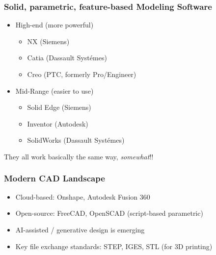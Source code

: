 \begin{frame}[fragile]\frametitle{Solid, parametric, feature-based Modeling Software}

\begin{itemize}
\item High-end (more powerful)
\begin{itemize}

\item NX (Siemens)
\item Catia (Dassault Syst\'{e}mes)
\item Creo (PTC, formerly Pro/Engineer)
\end{itemize}

\item Mid-Range (easier to use)
\begin{itemize}

\item Solid Edge (Siemens)
\item Inventor (Autodesk)
\item SolidWorks (Dassault Syst\'{e}mes)
\end{itemize}
\end{itemize}

They all work basically the same way, \textit{somewhat}!!

\end{frame}

\begin{frame}[fragile]\frametitle{Modern CAD Landscape}
\begin{itemize}
\item Cloud-based: Onshape, Autodesk Fusion 360
\item Open-source: FreeCAD, OpenSCAD (script-based parametric)
\item AI-assisted / generative design is emerging
\item Key file exchange standards: STEP, IGES, STL (for 3D printing)
\end{itemize}
\end{frame}